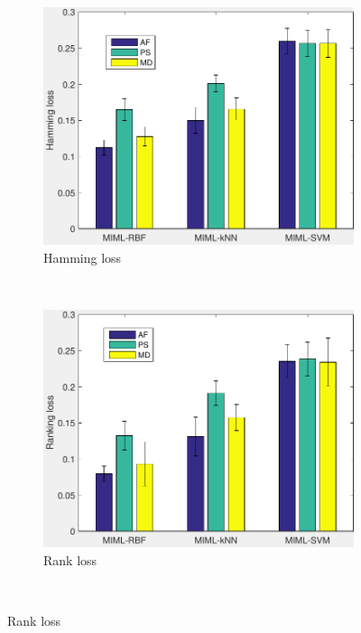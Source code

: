 \begin{figure}[htb!]
\centering

        \begin{subfigure}[b]{0.45\textwidth}
                \includegraphics[width=\textwidth]{image/Ch6/hammingLoss.pdf}
                \caption{Hamming loss}
        \end{subfigure}
       ~
              \begin{subfigure}[b]{0.45\textwidth}
                \includegraphics[width=\textwidth]{image/Ch6/rankingLoss.pdf}
                                \caption{Rank loss}               
        \end{subfigure}  
     \\

\end{figure}
